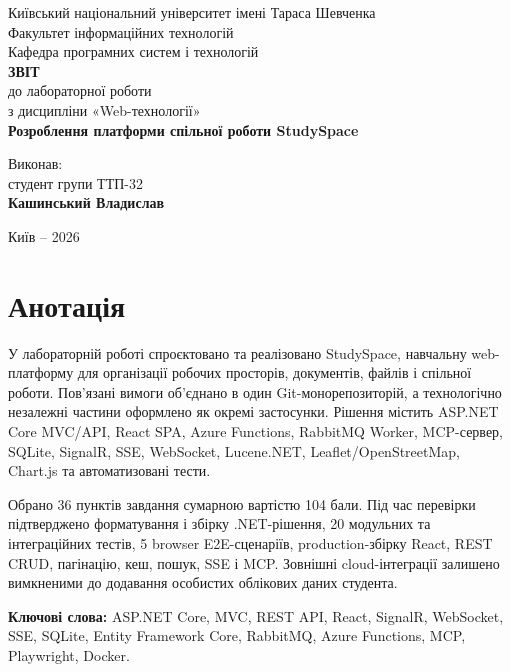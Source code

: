 \documentclass[12pt,a4paper]{article}
\begin{document}
\thispagestyle{empty}
\begin{center}
{\large Київський національний університет імені Тараса Шевченка}\\[0.5em]
{\large Факультет інформаційних технологій}\\
{\large Кафедра програмних систем і технологій}\\[4.6cm]
{\Large\bfseries ЗВІТ}\\[0.5em]
{\large до лабораторної роботи}\\[0.25em]
{\large з дисципліни «Web-технології»}\\[0.9em]
{\Large\bfseries Розроблення платформи спільної роботи StudySpace}
\end{center}
\vfill
\begin{flushright}\begin{minipage}{0.48\textwidth}
Виконав:\\ студент групи ТТП-32\\ \textbf{Кашинський Владислав}\\[1.2em]
\end{minipage}\end{flushright}
\vfill
\begin{center}Київ -- 2026\end{center}

\newpage
\section*{Анотація}
У лабораторній роботі спроєктовано та реалізовано StudySpace, навчальну
web-платформу для організації робочих просторів, документів, файлів і
спільної роботи. Пов'язані вимоги об'єднано в один Git-монорепозиторій,
а технологічно незалежні частини оформлено як окремі застосунки. Рішення
містить ASP.NET Core MVC/API, React SPA, Azure Functions, RabbitMQ Worker,
MCP-сервер, SQLite, SignalR, SSE, WebSocket, Lucene.NET,
Leaflet/OpenStreetMap, Chart.js та автоматизовані тести.

Обрано 36 пунктів завдання сумарною вартістю 104 бали. Під час перевірки
підтверджено форматування і збірку .NET-рішення, 20 модульних та
інтеграційних тестів, 5 browser E2E-сценаріїв, production-збірку React,
REST CRUD, пагінацію, кеш, пошук, SSE і MCP. Зовнішні cloud-інтеграції
залишено вимкненими до додавання особистих облікових даних студента.

\textbf{Ключові слова:} ASP.NET Core, MVC, REST API, React, SignalR,
WebSocket, SSE, SQLite, Entity Framework Core, RabbitMQ, Azure Functions,
MCP, Playwright, Docker.
\end{document}
